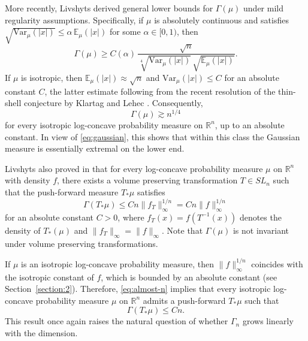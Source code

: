 \documentclass[11pt,leqno]{article}
\theoremstyle{remark}
\numberwithin{equation}{section}
\newcommand{\ls}{\leqslant}
\newcommand{\gr}{\geqslant}
\begin{document}
More recently, Livshyts \cite{Livshyts-2021} derived general lower bounds for $\Gamma(\mu)$ under mild regularity assumptions.
Specifically, if $\mu$ is absolutely continuous and satisfies
$\sqrt{\mathrm{Var}_{\mu}(|x|)}\ls \alpha\,\mathbb{E}_{\mu}(|x|)$ for some $\alpha\in [0,1)$,
then
\begin{equation}\label{eq:galyna-lower-bound}
\Gamma(\mu)\gr C(\alpha)\,
\frac{\sqrt{n}}{\sqrt[4]{\mathrm{Var}_{\mu}(|x|)}\,\sqrt{\mathbb{E}_{\mu}(|x|)}}.
\end{equation}
If $\mu$ is isotropic, then $\mathbb{E}_{\mu}(|x|)\approx\sqrt{n}$ and $\mathrm{Var}_{\mu}(|x|)\ls C$ for an absolute constant $C$, the latter estimate following from the recent resolution of the thin-shell conjecture by Klartag and Lehec \cite{Klartag-Lehec-2025b}.
Consequently,
\begin{equation}\label{eq:lower-bound-isotropic}
\Gamma(\mu)\gtrsim n^{1/4}
\end{equation}
for every isotropic log-concave probability measure on $\mathbb{R}^n$, up to an absolute constant. In view of \eqref{eq:gaussian}, this shows that within this class the Gaussian measure is essentially extremal on the lower end. 

Livshyts also proved in \cite{Livshyts-2021} that for every log-concave probability measure $\mu$ on $\mathbb{R}^n$ with density $f$, 
there exists a volume preserving transformation $T\in SL_n$ such that the push-forward measure $T_{\ast}\mu$ satisfies
\begin{equation}\label{eq:almost-n}
\Gamma(T_{\ast}\mu)\ls Cn\|f_T\|_{\infty}^{1/n}=Cn\|f\|_{\infty}^{1/n}
\end{equation}
for an absolute constant $C>0$, where $f_T(x)=f(T^{-1}(x))$ denotes the density of $T_{\ast}(\mu)$ and $\|f_T\|_{\infty}=\|f\|_{\infty}$. 
Note that $\Gamma(\mu)$ is not invariant under volume preserving transformations.

If $\mu$ is an isotropic log-concave probability measure, then $\|f\|_{\infty}^{1/n}$ coincides with the isotropic constant of $f$, 
which is bounded by an absolute constant (see Section~\ref{section:2}). 
Therefore, \eqref{eq:almost-n} implies that every isotropic log-concave probability measure $\mu$ on $\mathbb{R}^n$ admits 
a push-forward $T_{\ast}\mu$ such that 
$$\Gamma(T_{\ast}\mu)\ls Cn.$$ 
This result once again raises the natural question of whether $\Gamma_n$ grows linearly with the dimension.


\end{document}
